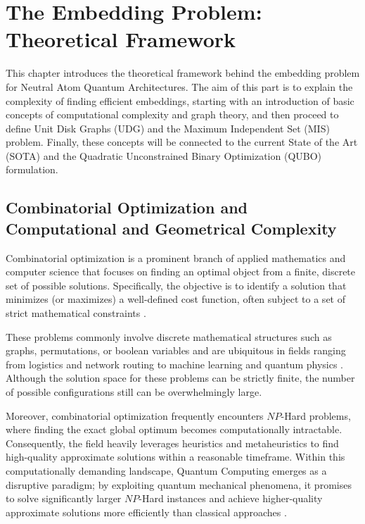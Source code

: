 \chapter{The Embedding Problem: Theoretical Framework} \label{chap:embedding_problem}

This chapter introduces the theoretical framework behind the embedding problem for Neutral Atom Quantum Architectures. 
The aim of this part is to explain the complexity of finding efficient embeddings, starting with an introduction of basic concepts 
of computational complexity and graph theory, and then proceed to define Unit Disk Graphs (UDG) and the Maximum Independent Set (MIS) problem. Finally, these concepts will be connected to the current State of the Art (SOTA) and the Quadratic Unconstrained Binary Optimization (QUBO) formulation.


\section{Combinatorial Optimization and Computational and Geometrical Complexity}
\label{sec:combinatorial_opti_def}


Combinatorial optimization is a prominent branch of applied mathematics and computer science that focuses on finding an optimal object from a finite, discrete set of possible solutions. Specifically, the objective is to identify a solution that minimizes (or maximizes) a well-defined cost function, often subject to a set of strict mathematical constraints \cite{korte2012combinatorial}. 

These problems commonly involve discrete mathematical structures such as graphs, permutations, or boolean variables and are ubiquitous in fields ranging from logistics and network routing to machine learning and quantum physics \cite{papadimitriou1998combinatorial}. Although the solution space for these problems can be strictly finite, the number of possible configurations still can be overwhelmingly large. 

Moreover, combinatorial optimization frequently encounters $NP$-Hard problems, where finding the exact global optimum becomes computationally intractable. Consequently, the field heavily leverages heuristics and metaheuristics to find high-quality approximate solutions within a reasonable timeframe. Within this computationally demanding landscape, Quantum Computing emerges as a disruptive paradigm; by exploiting quantum mechanical phenomena, it promises to solve significantly larger $NP$-Hard instances and achieve higher-quality approximate solutions more efficiently than classical approaches \cite{quantumReport}.

